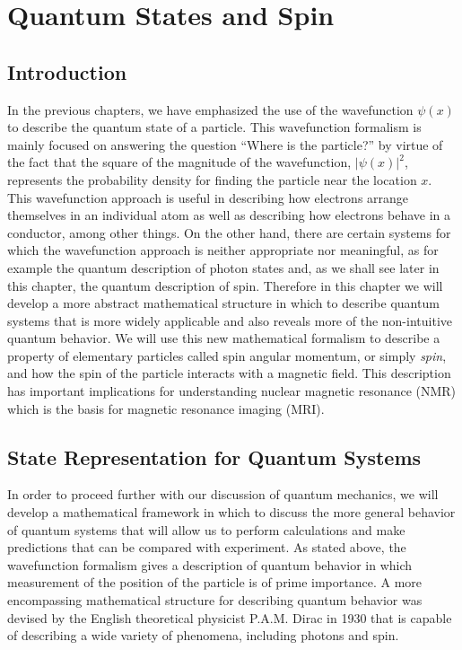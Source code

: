 

\chapter[Quantum States and Spin]{Quantum States and Spin}
\label{chapter:spin}

\section{Introduction}
\label{sec:spin_intro}

In the previous chapters, 
we have emphasized the use of the wavefunction $\psi(x)$ to describe
the quantum state of a particle.  This wavefunction formalism is mainly
focused on answering the question ``Where is the particle?'' by virtue of
the fact that the square of the magnitude of the wavefunction, $\left|
\psi(x) \right|^2$, represents the probability density for finding
the particle near the location $x$. This wavefunction approach is
useful in describing how electrons arrange themselves in an individual
atom as well as describing how electrons behave in a conductor, among
other things.  On the other hand, there are certain systems for which
the wavefunction approach is neither appropriate nor meaningful, as for
example the quantum description of photon states and, as we shall see
later in this chapter, the quantum description of spin. Therefore in
this chapter we will develop a more abstract mathematical structure in
which to describe quantum systems that is more widely applicable and
also reveals more of the non-intuitive quantum behavior.  We will use
this new mathematical formalism to describe a property of elementary
particles called spin angular momentum, or simply {\em spin}, and how the
spin of the particle interacts with a magnetic field. This description
has important implications for understanding nuclear magnetic resonance
(NMR) which is the basis for magnetic resonance imaging (MRI).


\section{State Representation for Quantum Systems}
\label{sec:state_representation}

In order to proceed further with our discussion of quantum mechanics, we
will develop a mathematical framework in which to discuss the more general
behavior of quantum systems that will allow us to perform calculations and
make predictions that can be compared with experiment.  As stated above,
the wavefunction formalism gives a description of quantum behavior in
which measurement of the position of the particle is of prime importance.
A more encompassing mathematical structure for describing quantum behavior
was devised by the English theoretical physicist P.A.M. Dirac in 1930
that is capable of describing a wide variety of phenomena,
including photons and spin.

